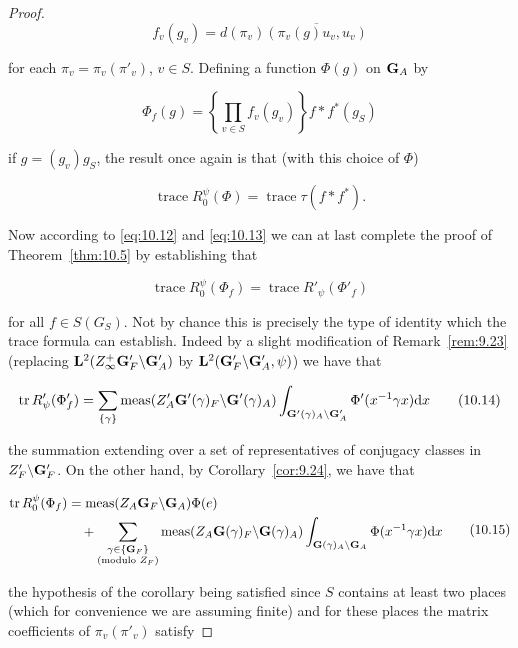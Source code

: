 \begin{proof}
\[
f_v(g_v) = d(\pi_v)\overline{(\pi_v(g)u_v, u_v)}
\]

for each $\pi_v = \pi_v(\pi'_v)$, $v \in S$. Defining a function $\Phi(g)$ on $\mathbf{G}_A$ by

\[
\Phi_f(g) = \left\{\prod_{v \in S} f_v(g_v)\right\} f * f^*(g_S)
\]

if $g = (g_v)g_S$, the result once again is that (with this choice of $\Phi$)

\begin{equation}\label{eq:10.13}
\operatorname{trace} R^{\psi}_0(\Phi) = \operatorname{trace} \tau(f * f^*).\tag{10.13}
\end{equation}

Now according to \eqref{eq:10.12} and \eqref{eq:10.13} we can at last complete the proof of Theorem~\ref{thm:10.5} by establishing that

\[
\operatorname{trace} R^{\psi}_0(\Phi_f) = \operatorname{trace} R'_\psi(\Phi'_f)
\]

for all $f \in S(G_S)$. Not by chance this is precisely the type of identity which the trace formula can establish. Indeed by a slight modification of Remark~\ref{rem:9.23} (replacing $\mathbf{L}^2(Z_\infty^+ \mathbf{G}'_F \backslash \mathbf{G}'_A)$ by $\mathbf{L}^2(\mathbf{G}'_F \backslash \mathbf{G}'_A, \psi)$) we have that

\begin{equation}\label{eq:10.14}
\operatorname{tr} R'_\psi(\Phi'_f) = \sum_{\{\gamma\}} \operatorname{meas}(Z'_A \mathbf{G}'(\gamma)_F \backslash \mathbf{G}'(\gamma)_A) \int_{\mathbf{G}'(\gamma)_A \backslash \mathbf{G}'_A} \Phi'(x^{-1}\gamma x) \mathrm{d} x\tag{10.14}
\end{equation}

the summation extending over a set of representatives of conjugacy classes in $Z'_F \backslash \mathbf{G}'_F$. On the other hand, by Corollary~\ref{cor:9.24}, we have that

\begin{equation}\label{eq:10.15}
\begin{aligned}
\operatorname{tr} R^{\psi}_0(\Phi_f) &= \operatorname{meas}(Z_A \mathbf{G}_F \backslash \mathbf{G}_A)\Phi(e) \\
&\quad + \sum_{\substack{\gamma \in \{\mathbf{G}_F\} \\ (\text{modulo } Z_F)}} \operatorname{meas}(Z_A \mathbf{G}(\gamma)_F \backslash \mathbf{G}(\gamma)_A) \int_{\mathbf{G}(\gamma)_A \backslash \mathbf{G}_A} \Phi(x^{-1}\gamma x) \mathrm{d} x
\end{aligned}\tag{10.15}
\end{equation}

the hypothesis of the corollary being satisfied since $S$ contains at least two places (which for convenience we are assuming finite) and for these places the matrix coefficients of $\pi_v(\pi'_v)$ satisfy


\end{proof}
